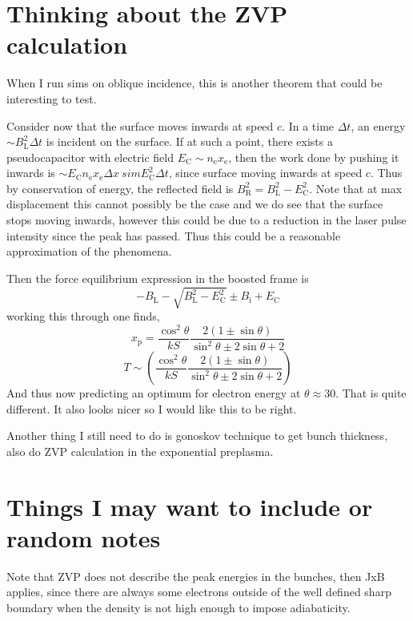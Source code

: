 \section{Thinking about the ZVP calculation}
When I run sims on oblique incidence, this is another theorem that could be interesting to test.

Consider now that the surface moves inwards at speed $c$. In a time $\Delta t$, an energy $\sim B_\mathrm{L}^2\Delta t$ is incident on the surface. If at such a point, there exists a pseudocapacitor with electric field $E_\mathrm{C} \sim n_\mathrm{e}x_\mathrm{e}$, then the work done by pushing it inwards is $\sim E_\mathrm{C} n_\mathrm{e}x_\mathrm{e} \Delta x \ sim E_\mathrm{C}^2\Delta t$, since surface moving inwards at speed $c$. Thus by conservation of energy, the reflected field is $B_\mathrm{R}^2 = B_\mathrm{L}^2 - E_\mathrm{C}^2$. Note that at max displacement this cannot possibly be the case and we do see that the surface stops moving inwards, however this could be due to a reduction in the laser pulse intensity since the peak has passed. Thus this could be a reasonable approximation of the phenomena.

Then the force equilibrium expression in the boosted frame is
\begin{equation}
	-B_\mathrm{L} - \sqrt{B_\mathrm{L}^2 - E_\mathrm{C}^2} \pm B_\mathrm{i} + E_\mathrm{C}
\end{equation}
working this through one finds,
\begin{equation}
	x_\mathrm{p} = \frac{\cos^2\theta}{kS}\frac{2(1\pm \sin\theta)}{\sin^2\theta \pm 2\sin\theta +2}
\end{equation}
\begin{equation}
	T \sim \left(\frac{\cos^2\theta}{kS}\frac{2(1\pm \sin\theta)}{\sin^2\theta \pm 2\sin\theta +2}\right)
\end{equation}
And thus now predicting an optimum for electron energy at $\theta \approx 30$\degree. That is quite different. It also looks nicer so I would like this to be right.

Another thing I still need to do is gonoskov technique to get bunch thickness, also do ZVP calculation in the exponential preplasma.


\section{Things I may want to include or random notes}
Note that ZVP does not describe the peak energies in the bunches, then JxB applies, since there are always some electrons outside of the well defined sharp boundary when the density is not high enough to impose adiabaticity. 


